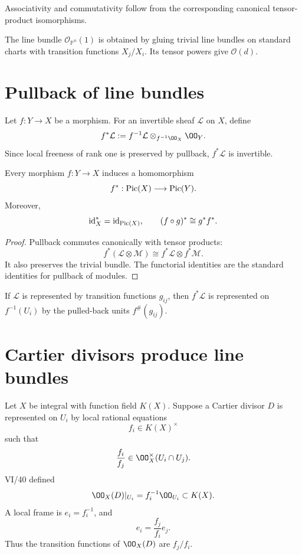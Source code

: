 Associativity and commutativity follow from the corresponding canonical tensor-product isomorphisms.



\begin{example}\label{ex:vi42-expand-01}
The line bundle $\mathcal O_{\mathbb P^n}(1)$ is obtained by gluing trivial line bundles on standard charts with transition functions $X_j/X_i$.  Its tensor powers give $\mathcal O(d)$.
\end{example}
\section{Pullback of line bundles}

Let \(f:Y\to X\) be a morphism.  For an invertible sheaf \(\mathcal L\) on \(X\), define
\[
  f^*\mathcal L
  :=
  f^{-1}\mathcal L\otimes_{f^{-1}\OO_X}\OO_Y.
\]
Since local freeness of rank one is preserved by pullback, \(f^*\mathcal L\) is invertible.

\begin{proposition}\label{prop:vi42-pic-functoriality}
Every morphism \(f:Y\to X\) induces a homomorphism
\[
  f^*:\operatorname{Pic}(X)\longrightarrow\operatorname{Pic}(Y).
\]
Moreover,
\[
  \operatorname{id}_X^*=\operatorname{id}_{\operatorname{Pic}(X)},
  \qquad
  (f\circ g)^*\cong g^*f^*.
\]
\end{proposition}

\begin{proof}
Pullback commutes canonically with tensor products:
\[
  f^*(\mathcal L\otimes\mathcal M)
  \cong
  f^*\mathcal L\otimes f^*\mathcal M.
\]
It also preserves the trivial bundle.  The functorial identities are the standard identities for pullback of modules.
\end{proof}

If \(\mathcal L\) is represented by transition functions \(g_{ij}\), then \(f^*\mathcal L\) is represented on \(f^{-1}(U_i)\) by the pulled-back units \(f^\#(g_{ij})\).

\section{Cartier divisors produce line bundles}

Let \(X\) be integral with function field \(K(X)\).  Suppose a Cartier divisor \(D\) is represented on \(U_i\) by local rational equations
\[
  f_i\in K(X)^\times
\]
such that
\[
  \frac{f_i}{f_j}\in\OO_X^\times(U_i\cap U_j).
\]
VI/40 defined
\[
  \OO_X(D)|_{U_i}
  =
  f_i^{-1}\OO_{U_i}
  \subset K(X).
\]
A local frame is \(e_i=f_i^{-1}\), and
\[
  e_i=\frac{f_j}{f_i}e_j.
\]
Thus the transition functions of \(\OO_X(D)\) are \(f_j/f_i\).


